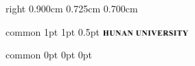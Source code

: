\documentclass[
    report,     %
    oneside,    %
    UTF8,       %
    zihao=-4    %
]{config} %
\begin{document}
\CoverPage
    {right} %
    {0.900cm} %
    {0.725cm} %
    {0.700cm} %


\Header
    {common} %
    {1pt} %
    {1pt} %
    {0.5pt} %
    {} %
    {\includegraphics[width=0.25\textwidth]{figures/logos/HNU-title-EN.png}} %
    {} %


\Footer
    {common} %
    {0pt} %
    {0pt} %
    {0pt} %
    {} %
    {\thepage} %
    {} %


\SetRomanPageNumber{} %

\end{document}
